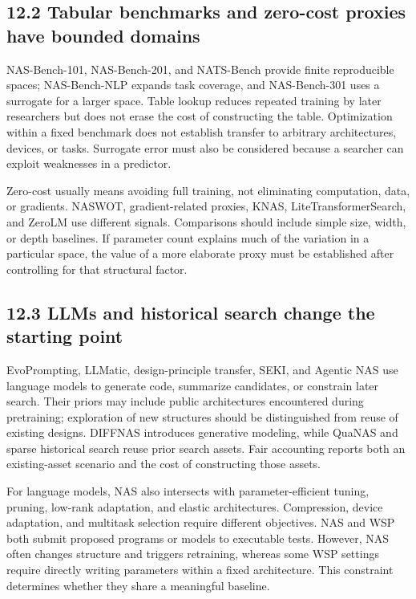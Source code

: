 \subsection*{12.2 Tabular benchmarks and zero-cost proxies have bounded domains}

NAS-Bench-101, NAS-Bench-201, and NATS-Bench provide finite reproducible spaces; NAS-Bench-NLP expands task coverage, and NAS-Bench-301 uses a surrogate for a larger space.\cite{r141,r148,r150,r152,r153} Table lookup reduces repeated training by later researchers but does not erase the cost of constructing the table. Optimization within a fixed benchmark does not establish transfer to arbitrary architectures, devices, or tasks. Surrogate error must also be considered because a searcher can exploit weaknesses in a predictor.


Zero-cost usually means avoiding full training, not eliminating computation, data, or gradients. NASWOT, gradient-related proxies, KNAS, LiteTransformerSearch, and ZeroLM use different signals.\cite{r149,r154,r158,r159,r170} Comparisons should include simple size, width, or depth baselines. If parameter count explains much of the variation in a particular space, the value of a more elaborate proxy must be established after controlling for that structural factor.


\subsection*{12.3 LLMs and historical search change the starting point}

EvoPrompting, LLMatic, design-principle transfer, SEKI, and Agentic NAS use language models to generate code, summarize candidates, or constrain later search.\cite{r160,r162,r167,r169,r172} Their priors may include public architectures encountered during pretraining; exploration of new structures should be distinguished from reuse of existing designs. DIFFNAS introduces generative modeling, while QuaNAS and sparse historical search reuse prior search assets.\cite{r173,r174,r175} Fair accounting reports both an existing-asset scenario and the cost of constructing those assets.


For language models, NAS also intersects with parameter-efficient tuning, pruning, low-rank adaptation, and elastic architectures.\cite{r161,r165,r166,r168,r171} Compression, device adaptation, and multitask selection require different objectives. NAS and WSP both submit proposed programs or models to executable tests. However, NAS often changes structure and triggers retraining, whereas some WSP settings require directly writing parameters within a fixed architecture. This constraint determines whether they share a meaningful baseline.


